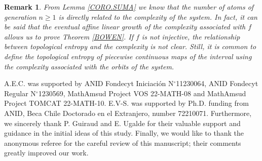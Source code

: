 \documentclass[a4paper]{article}
\newtheorem{remark}[theorem]{Remark}
\begin{document}
\begin{remark}
    From Lemma \ref{CORO.SUMA} we know that the number of atoms of generation $n\geq1$ is directly related to the complexity of the system. In fact, it can be said that the eventual affine linear growth of the complexity associated with $f$ allows us to prove {Theorem} \ref{BOWEN}. If $f$ is not injective, the relationship between topological entropy and the complexity is not clear. Still, it is common to define the topological entropy of piecewise continuous maps of the interval using the complexity associated with the orbits of the system.
\end{remark}


 A.E.C. was supported by ANID Fondecyt Iniciación N$^{\circ}$11230064, ANID Fondecyt Re\-gu\-lar N$^{\circ}$1230569, MathAmsud Project VOS 22-MATH-08 and MathAmsud Project TOMCAT 22-MATH-10. E.V-S. was supported by Ph.D. funding from ANID, Beca Chile Doctorado en el Extranjero, number 72210071. {Furthermore, we sincerely thank P. Guiraud and E. Ugalde for their va\-lua\-ble support and guidance in the initial ideas of this study. Finally, we would like to thank the anonymous referee for the careful review of this manuscript; their comments greatly improved our work.}
\end{document}
